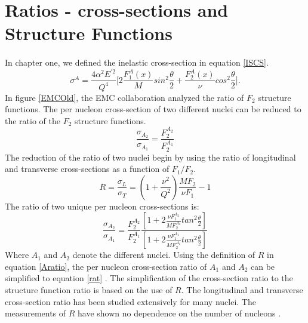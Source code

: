 \section{Ratios - cross-sections and Structure Functions}
\paragraph{}In chapter one, we defined the inelastic cross-section in equation \ref{ISCS}.  
\begin{equation}
\label{ISCSch2}
\sigma^A=\frac{4\alpha^2E^{\prime 2}}{Q^4} \bigg\lbrack 2\frac{F_1^A(x)}{M}sin^2\frac{\theta}{2} + \frac{F_2^A(x)}{\nu}cos^2\frac{\theta}{2} \bigg \rbrack.
\end{equation} 
In figure \ref{EMCOld}, the EMC collaboration analyzed the ratio of $F_2$ structure functions. The per nucleon cross-section of two different nuclei can be reduced to the ratio of the $F_2$ structure functions.  
\begin{equation}
\label{rat}
\frac{\sigma_{A_2}}{\sigma_{A_1}} = \frac{F_2^{A_2}}{F_2^{A_1}}
\end{equation}
The reduction of the ratio of two nuclei begin by using the ratio of longitudinal and transverse cross-sections as a function of $F_1/F_2$.
\begin{equation}
R=\frac{\sigma_{L}}{\sigma_{T}} =\left(1+\frac{\nu^2}{Q^2} \right)\frac{MF_2}{\nu F_1} -1
\label{Rratio}
\end{equation}
The ratio of two unique per nucleon cross-sections is:
\begin{equation}
\label{Aratio}
\frac{\sigma_{A_2}}{\sigma_{A_1}} = \frac{F_2^{A_2}}{F_2^{A_1}} \frac{\left[1+ 2\frac{\nu F_1^{A_2} }{MF_2^{A_2}} tan^2\frac{\theta}{2} \right]}{\left[1+ 2\frac{\nu F_1^{A_1} }{MF_2^{A_1}} tan^2\frac{\theta}{2} \right]}
\end{equation}
Where $A_1$ and $A_2$ denote the different nuclei. Using the definition of $R$ in equation \ref{Aratio}, the per nucleon cross-section ratio of $A_1$ and $A_2$ can be simplified to equation \ref{rat} \cite{EM,seelyth}. The simplification of the cross-section ratio to the structure function ratio is based on the use of $R$. The longitudinal and transverse cross-section ratio has been studied extensively for many nuclei. The measurements of $R$ have shown no dependence on the number of nucleons \cite{EM}. 
